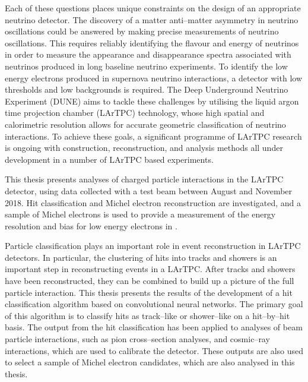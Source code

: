 Each of these questions places unique constraints on the design of an
appropriate neutrino detector. The discovery of a matter anti--matter asymmetry
in neutrino oscillations could be answered by making precise measurements of
neutrino oscillations. This requires reliably identifying the flavour and energy
of neutrinos in order to measure the appearance and disappearance spectra
associated with neutrinos produced in long baseline neutrino experiments. To
identify the low energy electrons produced in supernova neutrino interactions, a
detector with low thresholds and low backgrounds is required. The Deep
Underground Neutrino Experiment (DUNE) aims to tackle these challenges by
utilising the liquid argon time projection chamber (LArTPC) technology, whose
high spatial and calorimetric resolution allows for accurate geometric
classification of neutrino interactions. To achieve these goals, a significant 
programme of LArTPC research is ongoing with construction, reconstruction, and 
analysis methods all under development in a number of LArTPC based 
experiments\cite{Acciarri:2016smi, Cavanna:2014iqa, Antonello:2015lea, 
Abi:2017aow}. 

This thesis presents analyses of charged particle interactions in the
\protodune{} LArTPC detector, using data collected with a test beam between 
August and November 2018. Hit classification and Michel electron reconstruction 
are investigated, and a sample of Michel electrons is used to provide a 
measurement of the energy resolution and bias for low energy electrons in 
\protodune{}.

Particle classification plays an important role in event reconstruction in 
LArTPC detectors. In particular, the clustering of hits into tracks and 
showers is an important step in reconstructing events in a LArTPC. After tracks
and showers have been reconstructed, they can be combined to build up a picture
of the full particle interaction. This thesis presents the results of the 
development of a hit classification algorithm based on convolutional neural
networks. The primary goal of this algorithm is to classify hits as 
track--like or shower--like on a hit--by--hit basis. The output from the hit 
classification has been applied to analyses of beam particle interactions, 
such as pion cross--section analyses, and cosmic--ray interactions, which 
are used to calibrate the \protodune{} detector. These outputs are also used 
to select a sample of Michel electron candidates, which are also analysed in 
this thesis.

